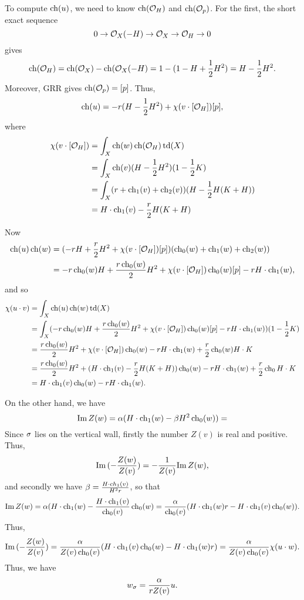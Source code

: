\documentclass[letterpaper,10pt]{article}
\begin{document}
To compute $\ch(u)$, we need to know $\ch(\Oh_H)$ and $\ch(\Oh_p)$. For the first, the short exact sequence
\[ 0 \to \Oh_X(-H) \to \Oh_X \to \Oh_H \to 0 \]
gives
\[ \ch(\Oh_H) = \ch(\Oh_X) - \ch(\Oh_X(-H) = 1 - (1 - H + \frac{1}{2} H^2) = H - \frac{1}{2} H^2. \]
Moreover, GRR gives $\ch(\Oh_p) = [p]$. Thus,
\[ \ch(u) = -r(H - \frac{1}{2}H^2) + \chi(v \cdot [\Oh_H])[p], \]
where
\begin{align*}
    \chi(v \cdot [\Oh_H]) & = \int_X \ch(w) \ch(\Oh_H) \td(X) \\
    & = \int_X \ch(v) (H - \frac{1}{2} H^2)(1 - \frac{1}{2} K) \\
    & = \int_X (r + \ch_1(v) + \ch_2(v))(H - \frac{1}{2}H(K + H)) \\
    & = H \cdot \ch_1(v) - \frac{r}{2} H(K+H)
\end{align*}
 

Now
\begin{align*}
    \ch(u) \ch(w) & = (-r H + \frac{r}{2} H^2 + \chi(v\cdot[\Oh_H]) [p])(\ch_0(w) + \ch_1(w) + \ch_2(w)) \\
    & = -r \ch_0(w) H + \frac{r \ch_0(w)}{2} H^2 + \chi(v\cdot[\Oh_H]) \ch_0(w)[p] - r H\cdot \ch_1(w),
\end{align*}
and so
\begin{align*}
    \chi(u\cdot v) & = \int_X \ch(u) \ch(w) \td(X) \\
    & = \int_X (-r \ch_0(w) H + \frac{r \ch_0(w)}{2} H^2 + \chi(v\cdot[\Oh_H]) \ch_0(w)[p] - r H\cdot \ch_1(w))(1 - \frac{1}{2}K) \\
    & = \frac{r \ch_0(w)}{2} H^2 + \chi(v \cdot [\Oh_H]) \ch_0(w) - r H\cdot \ch_1(w) + \frac{r}{2} \ch_0(w) H\cdot K \\
    & = \frac{r \ch_0(w)}{2} H^2 + (H \cdot \ch_1(v) - \frac{r}{2} H(K+H)) \ch_0(w) - r H\cdot \ch_1(w) + \frac{r}{2} \ch_0 H\cdot K \\
    & = H \cdot \ch_1(v) \ch_0(w) - r H \cdot \ch_1(w).
\end{align*}

On the other hand, we have
\[ \im Z(w) = \al (H \cdot \ch_1(w) - \be H^2 \ch_0(w)) =  \]
Since $\si$ lies on the vertical wall, firstly the number $Z(v)$ is real and positive. Thus,
\[ \im(-\frac{Z(w)}{Z(v)}) = -\frac{1}{Z(v)} \im Z(w), \]
and secondly we have $\be = \frac{H \cdot ch_1(v)}{H^2 r}$, so that
\[ \im Z(w) = \al(H\cdot \ch_1(w) - \frac{H \cdot \ch_1(v)}{\ch_0(v)} \ch_0(w) = \frac{\al}{\ch_0(v)} (H\cdot \ch_1(w) r - H \cdot \ch_1(v) \ch_0(w)). \]
Thus,
\[ \im(-\frac{Z(w)}{Z(v)}) = \frac{\al}{Z(v) \ch_0(v)} (H \cdot \ch_1(v) \ch_0(w) - H\cdot \ch_1(w) r) = \frac{\al}{Z(v) \ch_0(v)} \chi(u \cdot w). \]
Thus, we have
\[ w_\si = \frac{\al}{r Z(v)} u. \]
\end{document}
